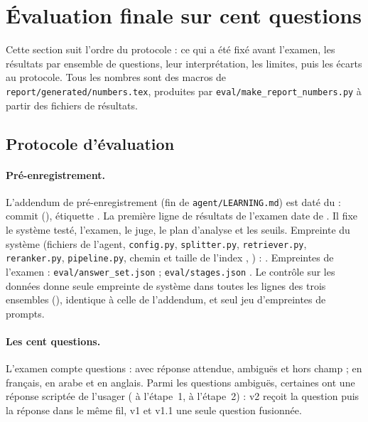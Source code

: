 \section{Évaluation finale sur cent questions}\label{sec:finale}

Cette section suit l'ordre du protocole : ce qui a été fixé avant l'examen, les résultats par ensemble de questions, leur
interprétation, les limites, puis les écarts au protocole. Tous les nombres sont des macros de
\texttt{report/generated/numbers.tex}, produites par \texttt{eval/make\_report\_numbers.py} à partir des fichiers de résultats.

\subsection{Protocole d'évaluation}\label{sec:protocole}

\paragraph{Pré-enregistrement.} L'addendum de pré-enregistrement (fin de \texttt{agent/LEARNING.md}) est daté du
\EvPreDate{} : commit \EvCommitAddendum{} (\EvDateAddendum), étiquette \texttt{\EvAddendumTag}. La première ligne de résultats
de l'examen date de \EvSoneFirst. Il fixe le système testé, l'examen, le juge, le plan d'analyse et les seuils.
Empreinte du système (fichiers de l'agent, \texttt{config.py}, \texttt{splitter.py}, \texttt{retriever.py},
\texttt{reranker.py}, \texttt{pipeline.py}, chemin et taille de l'index \texttt{\EvPreIndex}, \EvPreChunks{} ) :
\texttt{\EvPreFingerprint}. Empreintes de l'examen : \texttt{eval/answer\_set.json} \texttt{\EvPreExamHash} ;
\texttt{eval/stages.json} \texttt{\EvPreStagesHash}. Le contrôle sur les données donne \EvRowFingerprintCount{} seule empreinte
de système dans toutes les lignes des trois ensembles (\texttt{\EvRowFingerprintShort}), identique à celle de l'addendum, et
\EvRowPromptSets{} seul jeu d'empreintes de prompts.

\paragraph{Les cent questions.} L'examen compte \EvExamN{} questions : \EvExamAnswer{} avec réponse attendue, \EvExamClarify{}
ambiguës et \EvExamRefuse{} hors champ ; \EvExamFr{} en français, \EvExamAr{} en arabe et \EvExamEn{} en anglais. Parmi les
questions ambiguës, certaines ont une réponse scriptée de l'usager (\EvSoneReplies{} à l'étape~1, \EvStwoReplies{} à
l'étape~2) : v2 reçoit la question puis la réponse dans le même fil, v1 et v1.1 une seule question fusionnée.

